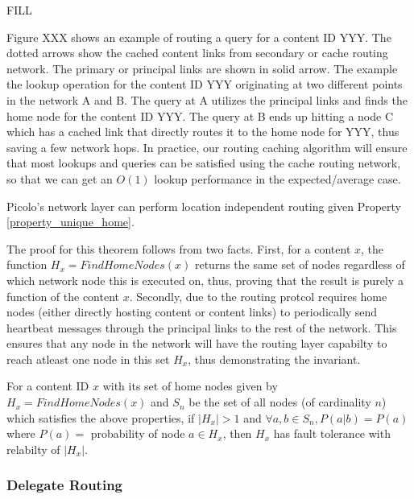 FILL

Figure XXX shows an example of routing a query for a content ID YYY. The dotted arrows show the cached content links from
secondary or cache routing network. The primary or principal links are shown in solid arrow. The example the lookup operation
for the content ID YYY originating at two different points in the network A and B. The query at A utilizes the principal
links and finds the home node for the content ID YYY. The query at B ends up hitting a node C which has a cached link that
directly routes it to the home node for YYY, thus saving a few network hops. In practice, our routing caching algorithm will
ensure that most lookups and queries can be satisfied using the cache routing network, so that we can get an \(O(1)\) lookup
performance in the expected/average case.

\begin{theorem}
Picolo's network layer can perform location independent routing given Property \ref{property_unique_home}.
\end{theorem}

The proof for this theorem follows from two facts. First, for a content \(x\), the function \(H_x = FindHomeNodes(x)\) returns
the same set of nodes regardless of which network node this is executed on, thus, proving that the result is purely a function
of the content \(x\). Secondly, due to the routing protcol requires home nodes (either directly hosting content or content links)
to periodically send heartbeat messages through the principal links to the rest of the network. This ensures that any node in the 
network will have the routing layer capabilty to reach atleast one node in this set \(H_x\), thus demonstrating the invariant. 

\begin{theorem}
   
    For a content ID \(x\) with its set of home nodes given by \( H_x = FindHomeNodes(x) \) and \(S_n\) be the set of
all nodes (of cardinality \(n\)) which satisfies the above properties, if \( |H_x| > 1 \) and \( \forall a, b \in S_n,
    P(a|b) = P(a) \) where \( P(a) = \) probability of node \(a \in H_x \), then \(H_x\) has fault tolerance with
    relabilty of \( | H_x | \).
\end{theorem}

\subsubsection{Delegate Routing}

